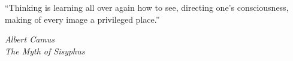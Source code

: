\epigraph{
“Thinking is learning all over again how to see, directing one's consciousness, making of every image a privileged place.”}{\textit{Albert Camus\\ The Myth of Sisyphus}}
%
